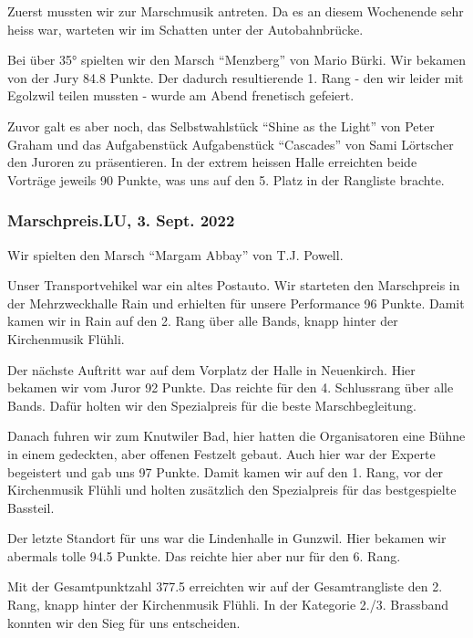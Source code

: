 \begin{history}
    Zuerst mussten wir zur Marschmusik antreten. Da es an diesem Wochenende sehr
    heiss war, warteten wir im Schatten unter der Autobahnbrücke.

    Bei über 35° spielten wir den Marsch \enquote{Menzberg} von Mario Bürki. Wir
    bekamen von der Jury 84.8 Punkte. Der dadurch resultierende 1. Rang - den
    wir leider mit Egolzwil teilen mussten - wurde am Abend frenetisch gefeiert.

    Zuvor galt es aber noch, das Selbstwahlstück \enquote{Shine as the Light}
    von Peter Graham und das Aufgabenstück Aufgabenstück \enquote{Cascades} von
    Sami Lörtscher den Juroren zu präsentieren. In der extrem heissen Halle
    erreichten beide Vorträge jeweils 90 Punkte, was uns auf den 5. Platz in der
    Rangliste brachte.

    \subsubsection*{Marschpreis.LU, 3. Sept. 2022}

    Wir spielten den Marsch \enquote{Margam Abbay} von T.J. Powell.

    Unser Transportvehikel war ein altes Postauto. Wir starteten den Marschpreis
    in der Mehrzweckhalle Rain und erhielten für unsere Performance 96 Punkte.
    Damit kamen wir in Rain auf den 2. Rang über alle Bands, knapp hinter der
    Kirchenmusik Flühli.

    Der nächste Auftritt war auf dem Vorplatz der Halle in Neuenkirch. Hier
    bekamen wir vom Juror 92 Punkte. Das reichte für den 4. Schlussrang über
    alle Bands. Dafür holten wir den Spezialpreis für die beste
    Marschbegleitung.

    Danach fuhren wir zum Knutwiler Bad, hier hatten die Organisatoren eine
    Bühne in einem gedeckten, aber offenen Festzelt gebaut. Auch hier war der
    Experte begeistert und gab uns 97 Punkte. Damit kamen wir auf den 1. Rang,
    vor der Kirchenmusik Flühli und holten zusätzlich den Spezialpreis für das
    bestgespielte Bassteil.

    Der letzte Standort für uns war die Lindenhalle in Gunzwil. Hier bekamen wir
    abermals tolle 94.5 Punkte. Das reichte hier aber nur für den 6. Rang.

    Mit der Gesamtpunktzahl 377.5 erreichten wir auf der Gesamtrangliste den 2.
    Rang, knapp hinter der Kirchenmusik Flühli. In der Kategorie 2./3. Brassband
    konnten wir den Sieg für uns entscheiden.



\end{history}
